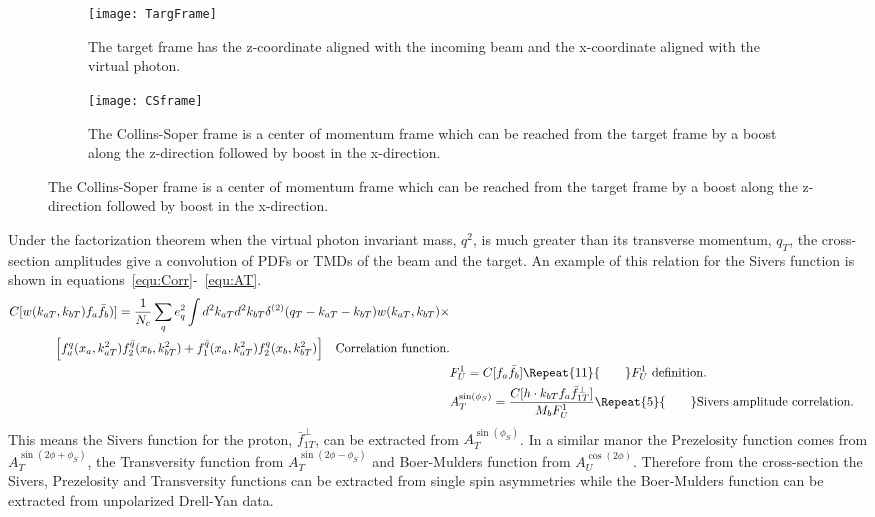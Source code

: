 \begin{figure}
  \centering
  \begin{subfigure}[b]{0.47\textwidth}
    \texttt{[image: TargFrame]}
    \caption{The target frame has the z-coordinate aligned with the
      incoming beam and the x-coordinate aligned with the virtual
      photon.}
    \label{fig:TargFrame}%
  \end{subfigure}
  \begin{subfigure}[b]{0.47\textwidth}
    \texttt{[image: CSframe]}
    \caption{The Collins-Soper frame is a center of momentum frame
      which can be reached from the target frame by a boost along the
      z-direction followed by boost in the x-direction.}
    \label{fig:CSframe}%
  \end{subfigure}
\end{figure}

Under the factorization theorem when the virtual photon invariant mass, $q^2$, is much greater than its transverse momentum, $q_T$, the cross-section amplitudes give a convolution of PDFs or TMDs of the beam and the target.  An example of this relation for the Sivers function is shown in equations~\ref{equ:Corr}-~\ref{equ:AT}.
%
\begin{subequations}
  \begin{align}
    \begin{split}
      C[w(k_{aT},k_{bT})f_a\bar{f}_b)] = \frac{1}{N_c}\sum_q e_q^2\int
      d^2k_{aT}d^2k_{bT}\delta^{(2)}(q_T - k_{aT}-k_{bT})w(k_{aT},
      k_{bT})\times\\ \Big [ f^q_a(x_a, k^2_{aT})f^{\bar q}_2(x_b,
        k^2_{bT}) + f^{\bar q}_1(x_a, k^2_{aT})f^q_2(x_b, k^2_{bT})
        \Big ] \quad \text{Correlation function.}\label{equ:Corr}
      \end{split}\\
    & F^1_U = C[f_a\bar{f}_b] \Repeat{11}{\qquad} \text{$F^1_U$ definition. }\\
    & A_T^{\sin(\phi_S)} = \frac{C[h \cdot k_{bT}f_a \bar{f}^{\perp}_{1T}]}{M_b F^1_U} \Repeat{5}{\qquad} \text{Sivers amplitude correlation.}\label{equ:AT}
  \end{align}
  \label{equ:SivCorr}
\end{subequations}
%
This means the Sivers function for the proton, $\bar{f}^{\perp}_{1T}$,
can be extracted from $A_T^{\sin(\phi_S)}$.  In a similar manor the
Prezelosity function comes from $A_T^{\sin(2\phi+\phi_S)}$, the
Transversity function from $A_T^{\sin(2\phi-\phi_S)}$ and Boer-Mulders
function from $A_U^{\cos(2\phi)}$.  Therefore from the cross-section
the Sivers, Prezelosity and Transversity functions can be extracted
from single spin asymmetries while the Boer-Mulders function can be
extracted from unpolarized Drell-Yan data. \par


